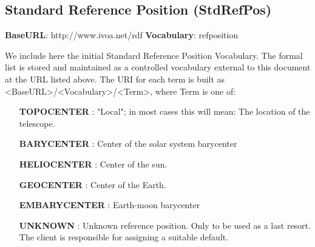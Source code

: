   \subsection{Standard Reference Position (StdRefPos)}
  \label{sect:StdRefPos}

  \textbf{BaseURL}:  http://www.ivoa.net/rdf \newline
  \textbf{Vocabulary}: refposition \newline

  We include here the initial Standard Reference Position Vocabulary.  The formal list is stored and maintained as a controlled vocabulary external to this document at the URL listed above.  The URI for each term is built as <BaseURL>/<Vocabulary>/<Term>, where Term is one of:

  \small
  \begin{itemize}
    \item[\textbf{TOPOCENTER}]: "Local"; in most cases this will mean: The location of the telescope.
    \item[\textbf{BARYCENTER}]: Center of the solar system barycenter
    \item[\textbf{HELIOCENTER}]: Center of the sun.
    \item[\textbf{GEOCENTER}]: Center of the Earth.
    \item[\textbf{EMBARYCENTER}]: Earth-moon barycenter
    \item[\textbf{UNKNOWN}]: Unknown reference position. \newline Only to be used as a last resort. The client is responsible for assigning a suitable default.
  \end{itemize}
  \normalsize
